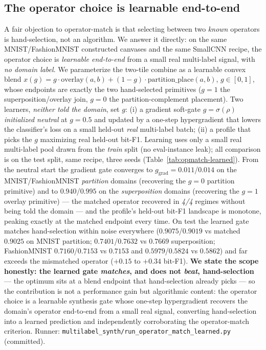 \documentclass[11pt]{article}
\begin{document}
\subsection{The operator choice is learnable end-to-end}\label{sec:opmatch-learned}
A fair objection to operator-match is that selecting between two \emph{known} operators is
hand-selection, not an algorithm. We answer it directly: on the same MNIST/FashionMNIST
constructed canvases and the same SmallCNN recipe, the operator choice is \emph{learnable
end-to-end} from a small real multi-label signal, with \emph{no domain label}. We parameterize
the two-tile combine as a learnable convex blend
$x(g) = g\cdot\mathrm{overlay}(a,b) + (1{-}g)\cdot\mathrm{partition\_place}(a,b)$, $g\in[0,1]$,
whose endpoints are exactly the two hand-selected primitives ($g{=}1$ the superposition/overlay
join, $g{=}0$ the partition-complement placement). Two learners, \emph{neither told the domain},
set $g$: (i) a gradient soft-gate $g=\sigma(\rho)$ \emph{initialized neutral} at $g{=}0.5$ and
updated by a one-step hypergradient that lowers the classifier's loss on a small held-out
\emph{real} multi-label batch; (ii) a profile that picks the $g$ maximizing real held-out
bit-F1. Learning uses only a small real multi-label pool drawn from the \emph{train} split (no
eval-instance leak); all comparison is on the test split, same recipe, three seeds
(Table~\ref{tab:opmatch-learned}). From the neutral start the gradient gate converges to
$g_{\text{grad}}{=}0.011$/$0.014$ on the MNIST/FashionMNIST \emph{partition} domains (recovering
the $g{=}0$ partition primitive) and to $0.940$/$0.995$ on the \emph{superposition} domains
(recovering the $g{=}1$ overlay primitive) --- the matched operator recovered in \emph{4/4}
regimes without being told the domain --- and the profile's held-out bit-F1 landscape is monotone,
peaking exactly at the matched endpoint every time. On test the learned gate matches
hand-selection within noise everywhere ($0.9075$/$0.9019$ vs matched $0.9025$ on MNIST partition;
$0.7401$/$0.7632$ vs $0.7669$ superposition; FashionMNIST $0.7160$/$0.7153$ vs $0.7153$ and
$0.5979$/$0.5824$ vs $0.5862$) and far exceeds the mismatched operator ($+0.15$ to $+0.34$
bit-F1). \textbf{We state the scope honestly: the learned gate \emph{matches}, and does not
\emph{beat}, hand-selection} --- the optimum sits at a blend endpoint that hand-selection already
picks --- so the contribution is not a performance gain but algorithmic content: the operator
choice is a learnable synthesis gate whose one-step hypergradient recovers the domain's operator
end-to-end from a small real signal, converting hand-selection into a learned prediction and
independently corroborating the operator-match criterion. Runner:
\texttt{multilabel\_synth/run\_operator\_match\_learned.py} (committed).
\end{document}
